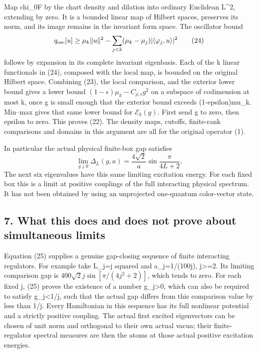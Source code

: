 \documentclass[
  11pt,
]{article}
\begin{document}
Map chi\_0F by the chart density and dilation into ordinary Euclidean
L\^{}2, extending by zero. It is a bounded linear map of Hilbert spaces,
preserves its norm, and its image remains in the invariant form space.
The oscillator bound \[
 q_{\rm osc}[u]\ge\mu_k\|u\|^2
       -\sum_{j<k}(\mu_k-\mu_j)|\langle\varphi_j,u\rangle|^2
\tag{24}
\] follows by expansion in its complete invariant eigenbasis. Each of
the k linear functionals in (24), composed with the local map, is
bounded on the original Hilbert space. Combining (23), the local
comparison, and the exterior lower bound gives a lower bound
\((1-\epsilon)\mu_k-C_{\rho,\epsilon}g^2\) on a subspace of codimension
at most k, once g is small enough that the exterior bound exceeds
(1-epsilon)mu\_k. Min--max gives that same lower bound for
\(\mathcal E_k(g)\). First send g to zero, then epsilon to zero. This
proves (22). The density maps, cutoffs, finite-rank comparisons and
domains in this argument are all for the original operator (1).

In particular the actual physical finite-box gap satisfies \[
 \boxed{\lim_{g\downarrow0}\Delta_L(g,a)
      =\frac{4\sqrt2}{a}\sin\frac{\pi}{4L+2}.}
\tag{25}
\] The next six eigenvalues have this same limiting excitation energy.
For each fixed box this is a limit at positive couplings of the full
interacting physical spectrum. It has not been obtained by using an
unprojected one-quantum color-vector state.

\subsection{7. What this does and does not prove about simultaneous
limits}\label{weak-coupling-part-1-what-this-does-and-does-not-prove-about-simultaneous-limits}

Equation (25) supplies a genuine gap-closing sequence of finite
interacting regulators. For example take L\_j=j squared and
a\_j=1/(100j), j\textgreater=2. Its limiting comparison gap is
\(400\sqrt2 j\sin[\pi/(4j^2+2)]\), which tends to zero. For each fixed
j, (25) proves the existence of a number g\_j\textgreater0, which can
also be required to satisfy g\_j\textless1/j, such that the actual gap
differs from this comparison value by less than 1/j. Every Hamiltonian
in this sequence has its full nonlinear potential and a strictly
positive coupling. The actual first excited eigenvectors can be chosen
of unit norm and orthogonal to their own actual vacua; their
finite-regulator spectral measures are then the atoms at those actual
positive excitation energies.
\end{document}
